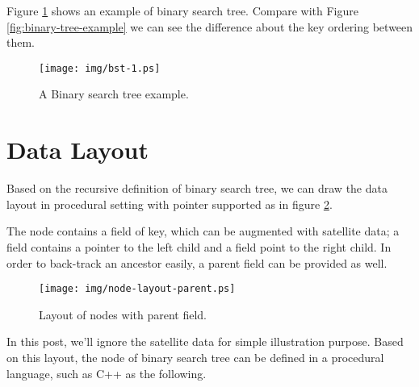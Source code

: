 \documentclass{article}
\begin{document}
Figure \ref{fig:bst-example} shows an example of binary search tree. Compare with
Figure \ref{fig:binary-tree-example} we can see the difference about the key
ordering between them.

\begin{figure}[htbp]
       \begin{center}
        \texttt{[image: img/bst-1.ps]}
        \caption{A Binary search tree example.} \label{fig:bst-example}
       \end{center}
\end{figure}


\section{Data Layout}

Based on the recursive definition of binary search tree, we can draw the
data layout in procedural setting with pointer supported as in figure
\ref{fig:node-layout-parent}.


The node contains a field of key, which can be augmented with satellite
data; a field contains a pointer to the left child and a field point to
the right child. In order to back-track an ancestor easily, a parent
field can be provided as well.

\begin{figure}[htbp]
       \begin{center}
        \texttt{[image: img/node-layout-parent.ps]}
        \caption{Layout of nodes with parent field.} \label{fig:node-layout-parent}
       \end{center}
\end{figure}

In this post, we'll ignore the satellite data for simple illustration purpose.
Based on this layout, the node of binary search tree can be defined in a procedural
language, such as C++ as the following.
\end{document}
